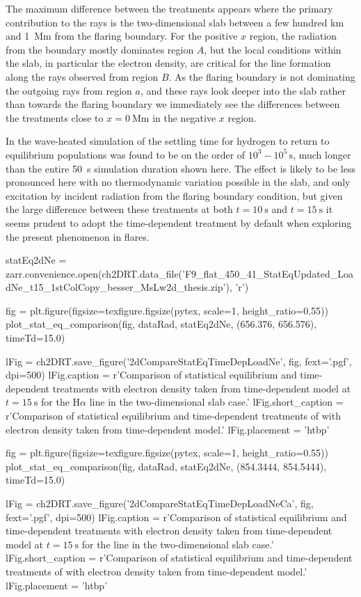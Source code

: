 The maximum difference between the treatments appears where the primary contribution to the rays is the two-dimensional slab between a few hundred \si{\kilo\metre} and \SI{1}{\mega\metre} from the flaring boundary.
For the positive $x$ region, the radiation from the boundary mostly dominates region $A$, but the local conditions within the slab, in particular the electron density, are critical for the line formation along the rays observed from region $B$.
As the flaring boundary is not dominating the outgoing rays from region $a$, and these rays look deeper into the slab rather than towards the flaring boundary we immediately see the differences between the treatments close to $x=\SI{0}{\mega\metre}$ in the negative $x$ region.

In the wave-heated \Radyn{} simulation of \citet{Carlsson2002} the settling time for hydrogen to return to equilibrium populations was found to be on the order of $10^3-10^5\,\si{\second}$, much longer than the entire \SI{50}{\second} simulation duration shown here.
The effect is likely to be less pronounced here with no thermodynamic variation possible in the slab, and only excitation by incident radiation from the flaring boundary condition, but given the large difference between these treatments at both $t=\SI{10}{\second}$ and $t=\SI{15}{\second}$ it seems prudent to adopt the time-dependent treatment by default when exploring the present phenomenon in flares.

\begin{pycode}[2DRT]

statEq2dNe = zarr.convenience.open(ch2DRT.data_file('F9_flat_450_41_StatEqUpdated_LoadNe_t15_1stColCopy_besser_MsLw2d_thesis.zip'), 'r')

fig = plt.figure(figsize=texfigure.figsize(pytex, scale=1, height_ratio=0.55))
plot_stat_eq_comparison(fig, dataRad, statEq2dNe, (656.376, 656.576), timeTd=15.0)

lFig = ch2DRT.save_figure('2dCompareStatEqTimeDepLoadNe', fig, fext='.pgf', dpi=500)
lFig.caption = r'Comparison of statistical equilibrium and time-dependent treatments with electron density taken from time-dependent model at $t=\SI{15}{\second}$ for the H$\alpha$ line in the two-dimensional slab case.'
lFig.short_caption = r'Comparison of statistical equilibrium and time-dependent treatments of \Ha{} with electron density taken from time-dependent model.'
lFig.placement = 'htbp'

fig = plt.figure(figsize=texfigure.figsize(pytex, scale=1, height_ratio=0.55))
plot_stat_eq_comparison(fig, dataRad, statEq2dNe, (854.3444, 854.5444), timeTd=15.0)

lFig = ch2DRT.save_figure('2dCompareStatEqTimeDepLoadNeCa', fig, fext='.pgf', dpi=500)
lFig.caption = r'Comparison of statistical equilibrium and time-dependent treatments with electron density taken from time-dependent model at $t=\SI{15}{\second}$ for the \CaLine{} line in the two-dimensional slab case.'
lFig.short_caption = r'Comparison of statistical equilibrium and time-dependent treatments of \CaLine{} with electron density taken from time-dependent model.'
lFig.placement = 'htbp'
\end{pycode}


